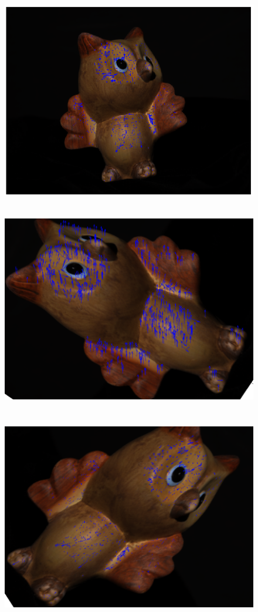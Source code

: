 \documentclass[11pt,psfig]{article}
\begin{document}
\begin{figure}[H]
\centering
\includegraphics[height=3.5in]{prob3figure1.png}
\end{figure}
\begin{figure}[H]
\centering
\includegraphics[height=3.5in]{prob3figure2.png}
\end{figure}
\begin{figure}[H]
\centering
\includegraphics[height=3.5in]{prob3figure3.png}
\end{figure}
\end{document}
